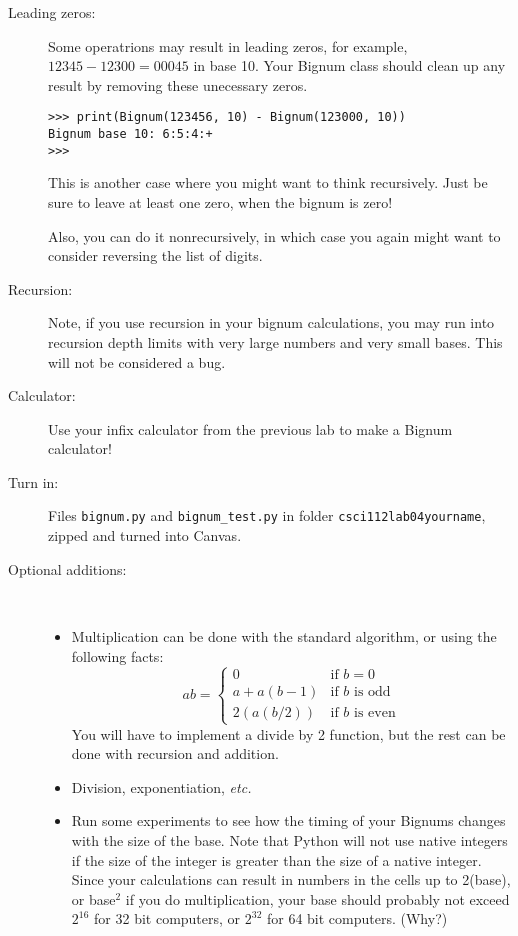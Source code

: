 \documentclass{article}
\begin{document}
\begin{description}
\item[Leading zeros:]  Some operatrions may result in leading zeros, for example,
$12345 - 12300 = 00045$ in base 10.  Your Bignum class should clean up any result
by removing these unecessary zeros.

\begin{lstlisting}
>>> print(Bignum(123456, 10) - Bignum(123000, 10))
Bignum base 10: 6:5:4:+
>>> 
\end{lstlisting}

This is another case where you might want to think recursively.
Just be sure to leave at least one zero, when the bignum is zero!

Also, you can do it nonrecursively, in which case you again
might want to consider reversing the list of digits.


\item[Recursion:]  Note, if you use recursion in your bignum calculations,
you may run into recursion depth limits with very large numbers and very
small bases.
This will not be considered a bug.

\item[Calculator:] Use your infix calculator from the previous lab to
make a Bignum calculator!

\item[Turn in:] Files {\tt bignum.py} and {\tt bignum\_test.py} in folder
{\tt csci112lab04yourname}, zipped and turned into Canvas.

\item[Optional additions:] ~

\begin{itemize}
\item
Multiplication can be done with the standard algorithm, or using the following facts:
\[
ab = 
\left\{\begin{array}{ll}
0 & \mbox{if $b=0$} \\
a+a(b-1) & \mbox{if $b$ is odd} \\
2(a(b/2)) & \mbox{if $b$ is even}
\end{array}\right.
\]
You will have to implement a divide by 2 function, but the rest can be done
with recursion and addition.

\item Division, exponentiation, {\em etc.}

\item Run some experiments to see how the timing of your
Bignums changes with the size of the base.  Note that Python will
not use native integers if the size of the integer is greater 
than the size of a native integer.  Since your calculations can result
in numbers in the cells up to 2(base), or base$^2$ if you do multiplication, 
your base should probably
not exceed $2^{16}$ for 32 bit computers, or $2^{32}$ for 64 bit
computers.  (Why?)


\end{itemize}
\end{description}
\end{document}
